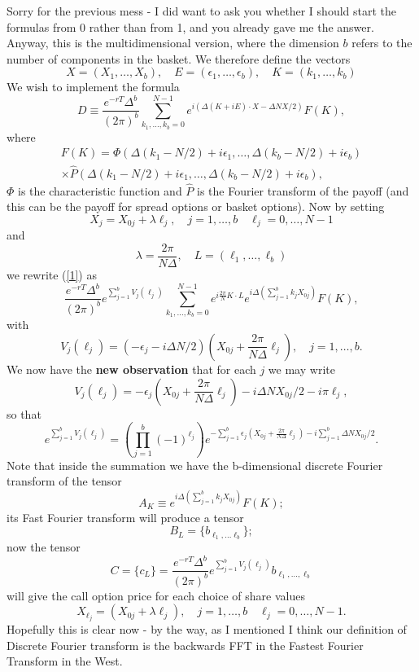 \documentclass[10pt]{amsart}
\newcommand{\epo}{\epsilon_1}
\begin{document}
Sorry for the previous mess - I did want to ask you whether I should start the formulas from 0 rather than from 1, and you already gave me the answer. Anyway, this is the multidimensional version, where the
dimension $b$ refers to the number of components in the basket. We therefore
define the vectors
\[X=(X_1,\ldots,X_b),\quad E=(\epsilon_1,\ldots,\epsilon_b),\quad K=(k_1,\ldots,k_b)\]
We wish to implement the formula
\begin{equation}\label{1}D\equiv \frac{e^{-rT}\Delta^b}{(2\pi)^b}\sum_{k_1,\ldots,k_b=0}^{N-1}
e^{i\left(\Delta(K+iE)\cdot X-\Delta N X/2\right)}F(K),
\end{equation}
where
\begin{multline*}F(K)= 
\Phi\left(\Delta(k_1-N/2)+i\epo,\ldots,\Delta(k_b-N/2)+i\epsilon_b\right)\\ \times \widehat{P}
\left(\Delta(k_1-N/2)+i\epo,\ldots,\Delta(k_b-N/2)+i\epsilon_b\right),%
\end{multline*}
$\Phi$ is the characteristic function and $\widehat{P}$ is the Fourier transform of the payoff (and this can be the payoff for spread options or basket options).
Now by setting \[ X_j=X_{0j}+\lambda\ell_j,\quad j=1,\ldots,b\quad\ell_j=0,\ldots,N-1\]
and \[\lambda=\frac{2\pi}{N\Delta},\quad L=(\ell_1,\ldots,\ell_b)\]
 we rewrite (\ref{1}) as 
\begin{equation}\label{2}\frac{e^{-rT}\Delta^b}{(2\pi)^b} e^{\sum_{j=1}^bV_j(\ell_j)}
\sum_{k_1,\ldots,k_b=0}^{N-1}
e^{i\frac{2\pi}{N}K\cdot L}e^{i\Delta(\sum_{j=1}^b k_jX_{0j})}F(K),
\end{equation}
with
\[V_j(\ell_j)=\left(-\epsilon_j-i\Delta N/2\right)\left(X_{0j}+\frac{2\pi}{N\Delta}\ell_j\right),\quad j=1,\ldots,b.\] 
We now have the \textbf{new observation} that for each $j$ we may write
\[V_j(\ell_j)=-\epsilon_j\left(X_{0j}+\frac{2\pi}{N\Delta}\ell_j\right)-i\Delta N X_{0j}/2-i\pi\ell_j,\]
so that
\[e^{\sum_{j=1}^bV_j(\ell_j)}=\left(\prod_{j=1}^b\left(-1\right)^{\ell_j}\right)e^{-\sum_{j=1}^b \epsilon_j \left(X_{0j}+\frac{2\pi}{N\Delta}\ell_j\right)
-i\sum_{j=1}^b\Delta N X_{0j}/2}.\]
Note that inside the summation we have the b-dimensional discrete Fourier transform of the 
tensor \[A_{K}\equiv e^{i\Delta(\sum_{j=1}^b k_jX_{0j})}F(K);\]
its Fast Fourier transform will produce a tensor \[B_{L}=\{b_{\ell_1,\ldots \ell_b}\};\] 
now the tensor
\[C=\{c_{L}\}=\frac{e^{-rT}\Delta^b}{(2\pi)^b} e^{\sum_{j=1}^bV_j(\ell_j)}
b_{\ell_1,\ldots,\ell_b} \]
will give the call option price for each choice of share values
\[X_{\ell_j}=(X_{0j}+\lambda\ell_j),\quad j=1,\ldots,b\quad\ell_j=0,\ldots,N-1.\]
Hopefully this is clear now - by the way, as I mentioned I think our definition of Discrete Fourier
transform is the backwards FFT in the Fastest Fourier Transform in the West.
\end{document}
